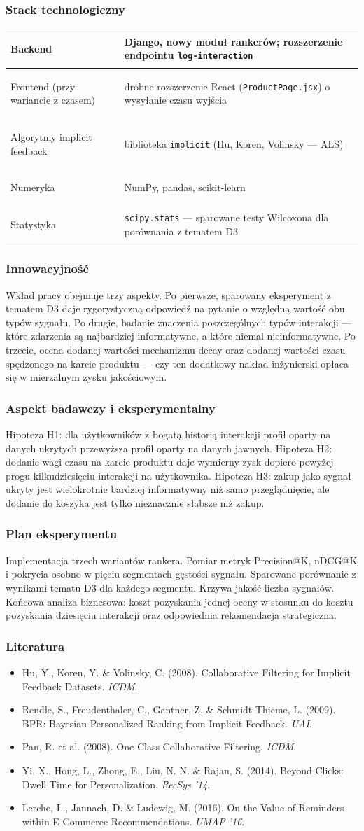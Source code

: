 \documentclass[12pt,a4paper]{article}
\newenvironment{stacktab}{%
    \arrayrulecolor{border}%
    \begin{tabular}{|>{\columncolor{lightbg}\bfseries\color{primary}\raggedright\arraybackslash}p{4.2cm}|>{\raggedright\arraybackslash}p{12cm}|}
    \hline
}{%
    \end{tabular}%
    \arrayrulecolor{black}%
}
\newcommand{\stackrow}[2]{#1 & #2 \\ \hline}
\newcommand{\topicsection}[1]{\subsubsection*{#1}}
\newenvironment{literatura}{%
    \topicsection{Literatura}
    \begin{itemize}[leftmargin=1.6em,labelsep=0.5em]
}{%
    \end{itemize}
}
\begin{document}
\topicsection{Stack technologiczny}
\begin{stacktab}
\stackrow{Backend}{Django, nowy moduł rankerów; rozszerzenie endpointu \texttt{log-interaction}}
\stackrow{Frontend (przy wariancie z czasem)}{drobne rozszerzenie React (\texttt{ProductPage.jsx}) o wysyłanie czasu wyjścia}
\stackrow{Algorytmy implicit feedback}{biblioteka \texttt{implicit} (Hu, Koren, Volinsky --- ALS)}
\stackrow{Numeryka}{NumPy, pandas, scikit-learn}
\stackrow{Statystyka}{\texttt{scipy.stats} --- sparowane testy Wilcoxona dla porównania z tematem D3}
\end{stacktab}

\topicsection{Innowacyjność}
Wkład pracy obejmuje trzy aspekty. Po pierwsze, sparowany eksperyment z tematem D3 daje rygorystyczną odpowiedź na pytanie o względną wartość obu typów sygnału. Po drugie, badanie znaczenia poszczególnych typów interakcji --- które zdarzenia są najbardziej informatywne, a które niemal nieinformatywne. Po trzecie, ocena dodanej wartości mechanizmu decay oraz dodanej wartości czasu spędzonego na karcie produktu --- czy ten dodatkowy nakład inżynierski opłaca się w mierzalnym zysku jakościowym.

\topicsection{Aspekt badawczy i eksperymentalny}
Hipoteza H1: dla użytkowników z bogatą historią interakcji profil oparty na danych ukrytych przewyższa profil oparty na danych jawnych. Hipoteza H2: dodanie wagi czasu na karcie produktu daje wymierny zysk dopiero powyżej progu kilkudziesięciu interakcji na użytkownika. Hipoteza H3: zakup jako sygnał ukryty jest wielokrotnie bardziej informatywny niż samo przeglądnięcie, ale dodanie do koszyka jest tylko nieznacznie słabsze niż zakup.

\topicsection{Plan eksperymentu}
Implementacja trzech wariantów rankera. Pomiar metryk Precision@K, nDCG@K i pokrycia osobno w pięciu segmentach gęstości sygnału. Sparowane porównanie z wynikami tematu D3 dla każdego segmentu. Krzywa jakość-liczba sygnałów. Końcowa analiza biznesowa: koszt pozyskania jednej oceny w stosunku do kosztu pozyskania dziesięciu interakcji oraz odpowiednia rekomendacja strategiczna.

\begin{literatura}
\item Hu, Y., Koren, Y. \& Volinsky, C. (2008). Collaborative Filtering for Implicit Feedback Datasets. \textit{ICDM}.
\item Rendle, S., Freudenthaler, C., Gantner, Z. \& Schmidt-Thieme, L. (2009). BPR: Bayesian Personalized Ranking from Implicit Feedback. \textit{UAI}.
\item Pan, R. et al. (2008). One-Class Collaborative Filtering. \textit{ICDM}.
\item Yi, X., Hong, L., Zhong, E., Liu, N. N. \& Rajan, S. (2014). Beyond Clicks: Dwell Time for Personalization. \textit{RecSys '14}.
\item Lerche, L., Jannach, D. \& Ludewig, M. (2016). On the Value of Reminders within E-Commerce Recommendations. \textit{UMAP '16}.
\end{literatura}
\end{document}
